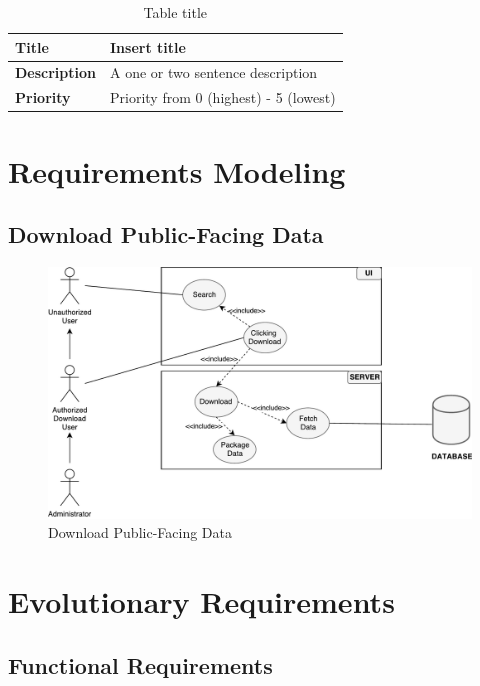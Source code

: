 \documentclass{article}
\begin{document}
\begin{table}[H]
	\caption{Table title}
	\begin{tabularx}{\textwidth}{|l|X|}
		\hline
		\textbf{Title}       & Insert title                           \\ \hline
		\textbf{Description} & A one or two sentence description      \\ \hline
		\textbf{Priority}    & Priority from 0 (highest) - 5 (lowest) \\ \hline
	\end{tabularx}
\end{table}

\clearpage

\section{Requirements Modeling}

\subsection{Download Public-Facing Data}

\begin{figure}[H]
	\begin{center}
		\caption{Download Public-Facing Data}
		\includegraphics[width=\textwidth]{images/download-use-case.pdf}
	\end{center}
\end{figure}

\clearpage

\section{Evolutionary Requirements}

\subsection{Functional Requirements}
\end{document}
